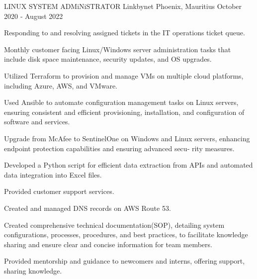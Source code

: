 \begin{cventries}
  \cventry
    {LINUX SYSTEM ADMiNiSTRATOR} %
    {Linkbynet} %
    {Phoenix, Mauritius} %
    {October 2020 ‑ August 2022} %
    {
      \begin{cvitems} %
        \item {Responding to and resolving assigned tickets in the IT operations ticket queue.}
        \item {Monthly customer facing Linux/Windows server administration tasks that include disk space maintenance, security updates, and OS upgrades.}
        \item {Utilized Terraform to provision and manage VMs on multiple cloud platforms, including Azure, AWS, and VMware.}
        \item {Used Ansible to automate configuration management tasks on Linux servers, ensuring consistent and efficient provisioning, installation, and
        configuration of software and services.}
        \item {Upgrade from McAfee to SentinelOne on Windows and Linux servers, enhancing endpoint protection capabilities and ensuring advanced secu‑
        rity measures.}
        \item {Developed a Python script for efficient data extraction from APIs and automated data integration into Excel files.}
        \item {Provided customer support services.}
        \item {Created and managed DNS records on AWS Route 53.}
        \item {Created comprehensive technical documentation(SOP), detailing system configurations, processes, procedures, and best practices, to facilitate
        knowledge sharing and ensure clear and concise information for team members.}
        \item {Provided mentorship and guidance to newcomers and interns, offering support, sharing knowledge.}
      \end{cvitems}
    }


\end{cventries}
